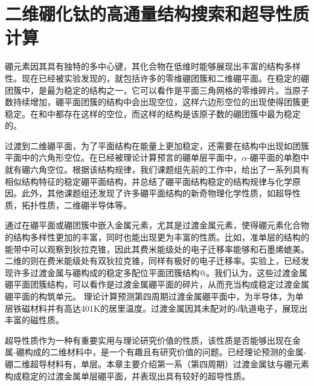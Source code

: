 \chapter{二维硼化钛的高通量结构搜索和超导性质计算}
\newcommand*{\rom}[1]{\uppercase\expandafter{\romannumeral #1\relax}}

硼元素因其具有独特的多中心键，其化合物在低维时能够展现出丰富的结构多样性。现在已经被实验发现的，就包括许多的零维硼团簇和二维硼平面。在稳定的硼团簇中，\cite{kiran2009origin}是最为稳定的结构之一，它可以看作是平面三角网格的零维碎片。当原子数持续增加，硼平面团簇的结构中会出现空位，这样六边形空位的出现使得团簇更稳定。在和\cite{pham2014boron}中都存在这样的空位，而这样的结构是该原子数的硼团簇中最为稳定的。

过渡到二维硼平面，为了平面结构在能量上更加稳定，还需要在结构中出现如团簇平面中的六角形空位。在已经被理论计算预言的硼单层平面中，$\alpha$-硼平面\cite{yang2008ab}的单胞中就有硼六角空位。根据该结构规律，我们课题组先前的工作中\cite{xu2017practical}，给出了一系列具有相似结构特征的稳定硼平面结构，并总结了硼平面结构稳定的结构规律与化学原因。此外，其他课题组还发现了许多硼平面结构的新奇物理化学性质，如超导性质\cite{penev2016can,zhao2016superconductivity}，拓扑性质\cite{feng2017dirac}，二维硼半导体\cite{xu2017two}等。

通过在硼平面或硼团簇中嵌入金属元素，尤其是过渡金属元素，使得硼元素化合物的结构多样性更加的丰富，同时也能出现更为丰富的性质。比如，准单层的结构的能带中可以观察到狄拉克锥\cite{zhang2014prediction}，因此其费米能级处的电子迁移率能够和石墨烯媲美。二维的\cite{xie2014first}则在费米能级处有双狄拉克锥，同样有极好的电子迁移率。实验上，已经发现许多过渡金属与硼构成的稳定多配位平面团簇结构@。我们认为，这些过渡金属硼平面团簇结构，可以看作是过渡金属硼平面的碎片，从而充当构成稳定过渡金属硼平面的构筑单元。
理论计算预测第四周期过渡金属硼平面中，\cite{li2016global}为半导体，\cite{li2019room}为单层铁磁材料并有高达401K的居里温度。过渡金属因其未配对的$d$轨道电子，展现出丰富的磁性质。

超导性质作为一种有重要实用与理论研究价值的性质，该性质是否能够出现在金属-硼构成的二维材料中，是一个有趣且有研究价值的问题。已经理论预测的金属-硼二维超导材料有\cite{yan2019prediction}，单层\cite{wu2016lithium}。本章主要介绍第一系（第四周期）过渡金属钛与硼元素构成稳定的过渡金属单层硼平面，并表现出具有较好的超导性质。

